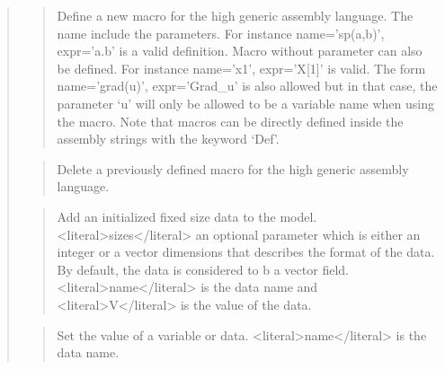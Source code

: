 \documentclass[a4paper,11pt,english]{sphinxmanual}
\begin{document}
\begin{quote}
\sphinxAtStartPar
{}
\begin{quote}

\sphinxAtStartPar
Define a new macro for the high generic assembly language.
The name include the parameters. For instance name=’sp(a,b)’, expr=’a.b’
is a valid definition. Macro without parameter can also be defined.
For instance name=’x1’, expr=’X{[}1{]}’ is valid. The form name=’grad(u)’,
expr=’Grad\_u’ is also allowed but in that case, the parameter ‘u’ will
only be allowed to be a variable name when using the macro. Note that
macros can be directly defined inside the assembly strings with the
keyword ‘Def’.
\end{quote}

\sphinxAtStartPar
{}
\begin{quote}

\sphinxAtStartPar
Delete a previously defined macro for the high generic assembly language.
\end{quote}

\sphinxAtStartPar
{}
\begin{quote}

\sphinxAtStartPar
Add an initialized fixed size data to the model. \textless{}literal\textgreater{}sizes\textless{}/literal\textgreater{} an
optional parameter which is either an
integer  or a vector dimensions that describes the format of the
data. By default, the data is considered to b a vector field.
\textless{}literal\textgreater{}name\textless{}/literal\textgreater{} is the data name and \textless{}literal\textgreater{}V\textless{}/literal\textgreater{} is the value of the data.
\end{quote}

\sphinxAtStartPar
{}
\begin{quote}

\sphinxAtStartPar
Set the value of a variable or data. \textless{}literal\textgreater{}name\textless{}/literal\textgreater{} is the data name.
\end{quote}

\sphinxAtStartPar
{}
\begin{quote}


\end{quote}
\end{quote}
\end{document}
